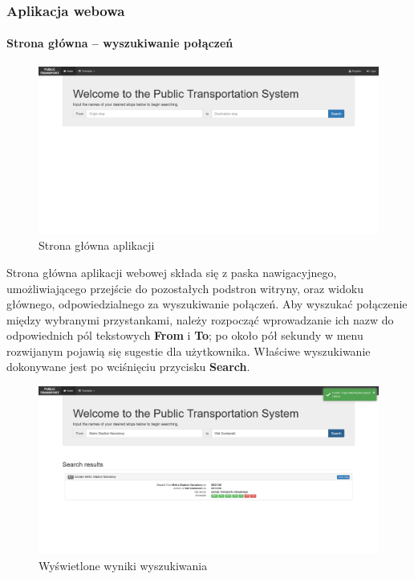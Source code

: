 \documentclass[10pt,a4paper]{article}
\begin{document}
\subsubsection{Aplikacja webowa}

\paragraph{Strona główna -- wyszukiwanie połączeń}
\begin{figure}[H]
	\centering
	\includegraphics[width=15cm]{Resources/Images/24_main_page.png}
	\caption{Strona główna aplikacji}
\end{figure}
Strona główna aplikacji webowej składa się z paska nawigacyjnego, umożliwiającego przejście do pozostałych podstron witryny, oraz widoku głównego, odpowiedzialnego za wyszukiwanie połączeń. Aby wyszukać połączenie między wybranymi przystankami, należy rozpocząć wprowadzanie ich nazw do odpowiednich pól tekstowych \textbf{From} i \textbf{To}; po około pół sekundy w menu rozwijanym pojawią się sugestie dla użytkownika. Właściwe wyszukiwanie dokonywane jest po wciśnięciu przycisku \textbf{Search}.
\begin{figure}[H]
	\centering
	\includegraphics[width=15cm]{Resources/Images/26_main_search_results.png}
	\caption{Wyświetlone wyniki wyszukiwania}
\end{figure}
\end{document}
